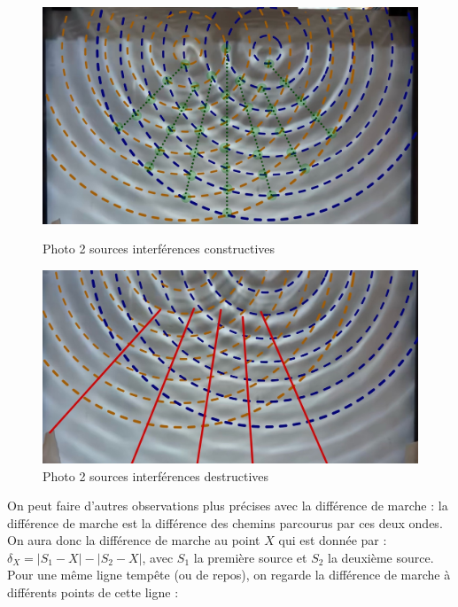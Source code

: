 \documentclass{report}
\begin{document}
\begin{figure}[H]
\centering
\begin{minipage}{0.45\textwidth}
  \centering
  \includegraphics[scale=0.14]{tempete.JPG}
  \caption{Photo 2 sources interférences constructives}
  \label{fig:s1}
\end{minipage}\hfill
\begin{minipage}{0.45\textwidth}
  \centering
  \includegraphics[scale=0.14]{repos.JPG}
  \caption{Photo 2 sources interférences destructives}
  \label{fig:s2}
\end{minipage}
\end{figure}

On peut faire d'autres observations plus précises avec la différence de marche : la différence de marche est la différence des chemins parcourus par ces deux ondes. On aura donc la différence de marche au point $X$ qui est donnée par : $\delta_X = \lvert S_1 - X \rvert - \lvert S_2 - X \rvert $, avec $S_1$ la première source et $S_2$ la deuxième source. Pour une même ligne tempête (ou de repos), on regarde la différence de marche à différents points de cette ligne : 
\newline
\end{document}
